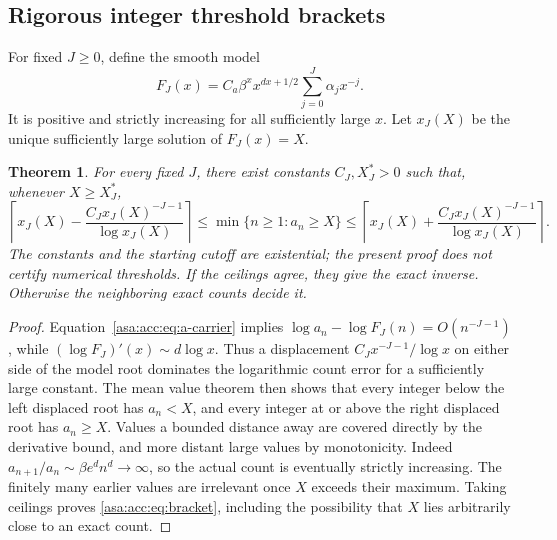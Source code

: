 \documentclass[11pt,letterpaper]{article}
\newtheorem{theorem}{Theorem}[section]
\theoremstyle{remark}\newtheorem{remark}[theorem]{Remark}
\numberwithin{equation}{section}
\begin{document}
\subsection{Rigorous integer threshold brackets}
For fixed $J\ge0$, define the smooth model
\begin{equation}\label{asa:acc:eq:FJ}
F_J(x)=C_a\beta^x x^{dx+1/2}\sum_{j=0}^{J}\alpha_jx^{-j}.
\end{equation}
It is positive and strictly increasing for all sufficiently large $x$. Let $x_J(X)$ be the unique sufficiently large solution of $F_J(x)=X$.

\begin{theorem}\label{asa:acc:thm:inverse}
For every fixed $J$, there exist constants $C_J,X_J^*>0$ such that, whenever $X\ge X_J^*$,
\begin{equation}\label{asa:acc:eq:bracket}
\left\lceil x_J(X)-\frac{C_Jx_J(X)^{-J-1}}{\log x_J(X)}\right\rceil
\le \min\{n\ge1:a_n\ge X\}
\le
\left\lceil x_J(X)+\frac{C_Jx_J(X)^{-J-1}}{\log x_J(X)}\right\rceil.
\end{equation}
The constants and the starting cutoff are existential; the present proof does not certify numerical thresholds. If the ceilings agree, they give the exact inverse. Otherwise the neighboring exact counts decide it.
\end{theorem}
\begin{proof}
Equation~\eqref{asa:acc:eq:a-carrier} implies
$\log a_n-\log F_J(n)=O(n^{-J-1})$, while
$(\log F_J)'(x)\sim d\log x$. Thus a displacement
$C_Jx^{-J-1}/\log x$ on either side of the model root dominates the logarithmic count error for a sufficiently large constant. The mean value theorem then shows that every integer below the left displaced root has $a_n<X$, and every integer at or above the right displaced root has $a_n\ge X$. Values a bounded distance away are covered directly by the derivative bound, and more distant large values by monotonicity. Indeed
$a_{n+1}/a_n\sim\beta e^d n^d\to\infty$, so the actual count is eventually strictly increasing. The finitely many earlier values are irrelevant once $X$ exceeds their maximum. Taking ceilings proves \eqref{asa:acc:eq:bracket}, including the possibility that $X$ lies arbitrarily close to an exact count.
\end{proof}
\end{document}
